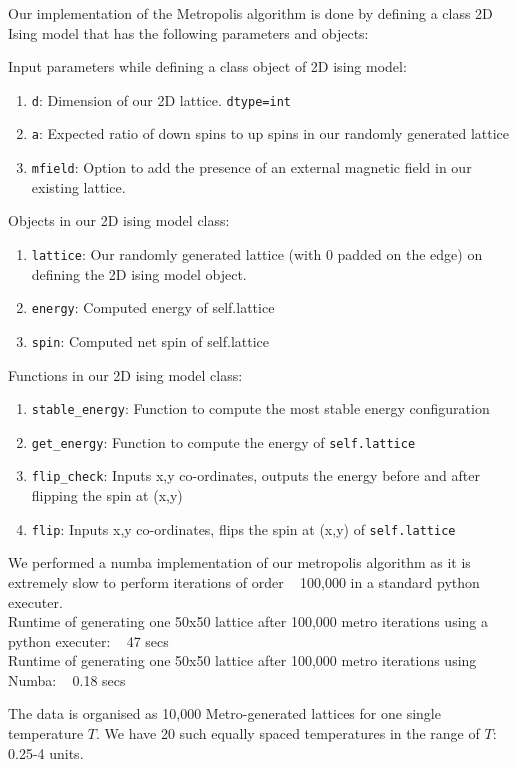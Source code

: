 Our implementation of the Metropolis algorithm is done by defining a class 2D Ising model that has the following parameters and objects:

Input parameters while defining a class object of 2D ising model:
\begin{enumerate}
    \item \texttt{d}: Dimension of our 2D lattice. \texttt{dtype=int}
    \item \texttt{a}: Expected ratio of down spins to up spins in our randomly generated lattice
    \item \texttt{mfield}: Option to add the presence of an external magnetic field in our existing lattice.
\end{enumerate}

Objects in our 2D ising model class:
\begin{enumerate}
    \item \texttt{lattice}: Our randomly generated lattice (with 0 padded on the edge) on defining the 2D ising model object.
    \item \texttt{energy}: Computed energy of self.lattice
    \item \texttt{spin}: Computed net spin of self.lattice
\end{enumerate}

Functions in our 2D ising model class:
\begin{enumerate}
    \item \texttt{stable\_energy}: Function to compute the most stable energy configuration
    \item \texttt{get\_energy}: Function to compute the energy of \texttt{self.lattice}
    \item \texttt{flip\_check}: Inputs x,y co-ordinates, outputs the energy before and after flipping the spin at (x,y)
    \item \texttt{flip}: Inputs x,y co-ordinates, flips the spin at (x,y) of \texttt{self.lattice}
\end{enumerate}

We performed a numba implementation of our metropolis algorithm as it is extremely slow to perform iterations of order ~ 100,000 in a standard python executer. \\
Runtime of generating one 50x50 lattice after 100,000 metro iterations using a python executer: ~ 47 secs\\
Runtime of generating one 50x50 lattice after 100,000 metro iterations using Numba: ~ 0.18 secs

The data is organised as 10,000 Metro-generated lattices for one single temperature $T$. We have 20 such equally spaced temperatures in the range of $T$: 0.25-4 units.

